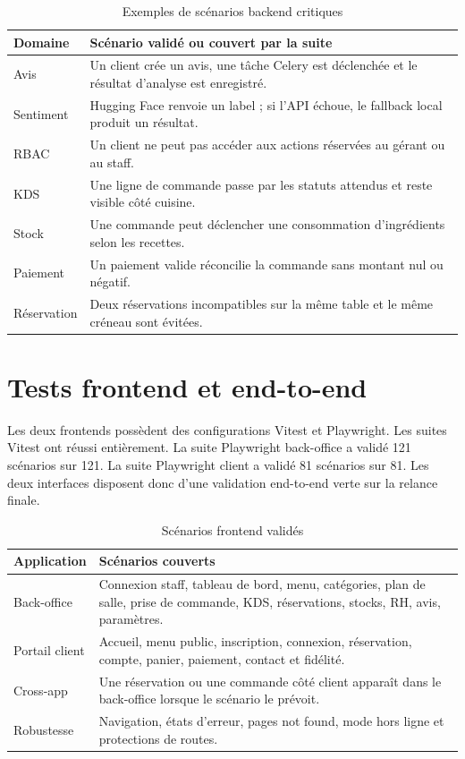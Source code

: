 \begin{table}[H]
\centering
\caption{Exemples de scénarios backend critiques}
\label{tab:tests-backend}
\begin{tabularx}{\textwidth}{p{3.4cm}Y}
\toprule
\textbf{Domaine} & \textbf{Scénario validé ou couvert par la suite} \\
\midrule
Avis & Un client crée un avis, une tâche Celery est déclenchée et le résultat d'analyse est enregistré. \\
Sentiment & Hugging Face renvoie un label ; si l'API échoue, le fallback local produit un résultat. \\
RBAC & Un client ne peut pas accéder aux actions réservées au gérant ou au staff. \\
KDS & Une ligne de commande passe par les statuts attendus et reste visible côté cuisine. \\
Stock & Une commande peut déclencher une consommation d'ingrédients selon les recettes. \\
Paiement & Un paiement valide réconcilie la commande sans montant nul ou négatif. \\
Réservation & Deux réservations incompatibles sur la même table et le même créneau sont évitées. \\
\bottomrule
\end{tabularx}
\end{table}

\section{Tests frontend et end-to-end}
Les deux frontends possèdent des configurations Vitest et Playwright. Les suites Vitest ont réussi entièrement. La suite Playwright back-office a validé 121 scénarios sur 121. La suite Playwright client a validé 81 scénarios sur 81. Les deux interfaces disposent donc d'une validation end-to-end verte sur la relance finale.

\begin{table}[H]
\centering
\caption{Scénarios frontend validés}
\label{tab:tests-frontend}
\begin{tabularx}{\textwidth}{p{3.4cm}Y}
\toprule
\textbf{Application} & \textbf{Scénarios couverts} \\
\midrule
Back-office & Connexion staff, tableau de bord, menu, catégories, plan de salle, prise de commande, KDS, réservations, stocks, RH, avis, paramètres. \\
Portail client & Accueil, menu public, inscription, connexion, réservation, compte, panier, paiement, contact et fidélité. \\
Cross-app & Une réservation ou une commande côté client apparaît dans le back-office lorsque le scénario le prévoit. \\
Robustesse & Navigation, états d'erreur, pages not found, mode hors ligne et protections de routes. \\
\bottomrule
\end{tabularx}
\end{table}

